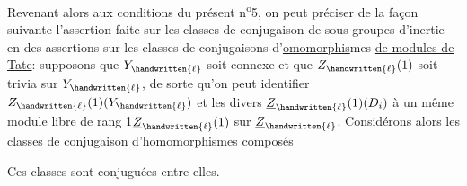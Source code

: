 Revenant alors aux conditions du présent n\textsuperscript{\uline{o}}5, on peut préciser de la façon suivante l'assertion faite sur les  classes de conjugaison de sous-groupes d'inertie en des assertions sur les classes de conjugaisons d'\uline{omomorphis}mes \uline{de modules de Tate}: supposons que $Y_{\handwritten{\ell}}$ soit connexe et que $Z_{\handwritten{\ell}}(1)$ soit trivia sur $Y_{\handwritten{\ell}}$,  de sorte qu'on peut identifier $Z_{\handwritten{\ell}}(1)(Y_{\handwritten{\ell}})$ et les divers $\underline{Z}_{\handwritten{\ell}}(1)(D_i)$ à un même module \handwritten{(}libre de rang 1\handwritten{)}$\underline{Z}_{\handwritten{\ell}}(1)$ sur $\underline{Z}_{\handwritten{\ell}}$. Considérons alors les classes de conjugaison d'homomorphismes composés

Ces classes sont conjuguées entre elles.
